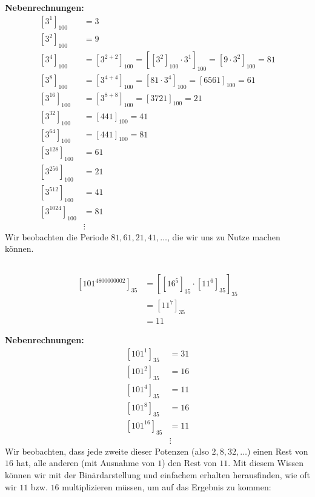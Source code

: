 \documentclass{../crypto}
\begin{document}
\textbf{Nebenrechnungen:}
\begin{align*}
  \left[3^{1}\right]_{100} &= 3 \\
  \left[3^{2}\right]_{100} &= 9 \\
  \left[3^{4}\right]_{100} &= \left[3^{2+2}\right]_{100} 
                            = \left[\left[3^{2}\right]_{100} \cdot 3^{1}\right]_{100} 
                            = \left[9 \cdot 3^{2}\right]_{100} = 81 \\
  \left[3^{8}\right]_{100} &= \left[3^{4+4}\right]_{100}
                            = \left[81 \cdot 3^{4}\right]_{100} 
                            = \left[6561\right]_{100} = 61 \\
  \left[3^{16}\right]_{100} &= \left[3^{8+8}\right]_{100}
                             = \left[3721\right]_{100} = 21 \\
  \left[3^{32}\right]_{100} &= \left[441\right]_{100} = 41 \\
  \left[3^{64}\right]_{100} &= \left[441\right]_{100} = 81 \\
  \left[3^{128}\right]_{100} &= 61 \\
  \left[3^{256}\right]_{100} &= 21 \\
  \left[3^{512}\right]_{100} &= 41 \\
  \left[3^{1024}\right]_{100} &= 81 \\
                              &\vdots
\end{align*}
Wir beobachten die Periode $81, 61, 21, 41, \dots$, die wir uns zu Nutze machen können.

\subsection{}
\begin{align*}
  \left[101^{4800000002}\right]_{35} &= \left[ \left[16^5\right]_{35} 
                                         \cdot \left[11^6\right]_{35}
                                        \right]_{35} \\
                                     &= \left[11^7\right]_{35} \\
                                     &= 11
\end{align*}

\textbf{Nebenrechnungen:}
\begin{align*}
  \left[101^{1}\right]_{35} &= 31 \\
  \left[101^{2}\right]_{35} &= 16 \\
  \left[101^{4}\right]_{35} &= 11 \\
  \left[101^{8}\right]_{35} &= 16 \\
  \left[101^{16}\right]_{35} &= 11 \\
                             &\vdots
\end{align*}
Wir beobachten, dass jede zweite dieser Potenzen (also $2, 8, 32, \dots$) einen
Rest von $16$ hat, alle anderen (mit Ausnahme von $1$) den Rest von $11$.
Mit diesem Wissen können wir mit der Binärdarstellung und einfachem erhalten
herausfinden, wie oft wir $11$ bzw. $16$ multiplizieren müssen, um auf das 
Ergebnis zu kommen:
\end{document}
